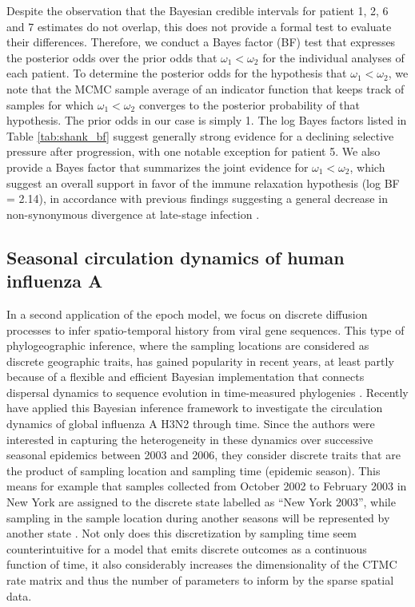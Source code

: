 Despite the observation that the Bayesian credible intervals for patient 1, 2, 6 and 7 estimates do not overlap, this does not provide a formal test to evaluate their differences.
Therefore, we conduct a Bayes factor (BF) test \citep{Suchard2005} that expresses the posterior odds over the prior odds that $\omega_{1} < \omega_{2}$ for the individual analyses of each patient.
To determine the posterior odds for the hypothesis that $\omega_{1} < \omega_{2}$, we note that the MCMC sample average of an indicator function that keeps track of samples for which $\omega_{1} < \omega_{2}$ converges to the posterior probability of that hypothesis.
The prior odds in our case is simply 1.
The log Bayes factors listed in Table \ref{tab:shank_bf} suggest generally strong evidence for a declining selective pressure after progression, with one notable exception for patient 5.
We also provide a Bayes factor that summarizes the joint evidence for $\omega_{1} < \omega_{2}$, which suggest an overall support in favor of the immune relaxation hypothesis (log BF = 2.14), in accordance with previous findings suggesting a general decrease in non-synonymous divergence at late-stage infection \citep{williamson2005, Lemey2007}.

\subsection{Seasonal circulation dynamics of human influenza A}

In a second application of the epoch model, we focus on discrete diffusion processes to infer spatio-temporal history from viral gene sequences.
This type of phylogeographic inference, where the sampling locations are considered as discrete geographic traits, has gained popularity in recent years, at least partly because of a flexible and efficient Bayesian implementation that connects dispersal dynamics to sequence evolution in time-measured phylogenies \citep{Lemey2009}.
Recently \citet{Bahl2011} have applied this Bayesian inference framework to investigate the circulation dynamics of global influenza A H3N2 through time.
Since the authors were interested in capturing the heterogeneity in these dynamics over successive seasonal epidemics between 2003 and 2006, they consider discrete traits that are the product of sampling location and sampling time (epidemic season).
This means for example that samples collected from October 2002 to February 2003 in New York are assigned to the discrete state labelled as ``New York 2003'', while sampling in the sample location during another seasons will be represented by another state \citep{Bahl2011}.
Not only does this discretization by sampling time seem counterintuitive for a model that emits discrete outcomes as a continuous function of time, it also considerably increases the dimensionality of the CTMC rate matrix and thus the number of parameters to inform by the sparse spatial data.

